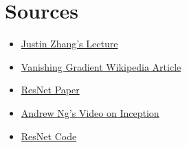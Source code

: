 \documentclass{article}
\begin{document}
\section{Sources}
\begin{itemize}
	\item \href{https://tjmachinelearning.com/lectures/1718/deepconv/deepconv.pdf}{Justin Zhang's Lecture} 
	\item \href{https://en.wikipedia.org/wiki/Vanishing_gradient_problem}{Vanishing Gradient Wikipedia Article}
	\item \href{https://arxiv.org/pdf/1512.03385v1.pdf}{ResNet Paper}
 	\item \href{https://www.coursera.org/lecture/convolutional-neural-networks/inception-network-motivation-5WIZm}{Andrew Ng's Video on Inception}
	\item \href{https://github.com/pytorch/vision/blob/7c077f6a986f05383bcb86b535aedb5a63dd5c4b/torchvision/models/resnet.py#L118}{ResNet Code}
\end{itemize}
\end{document}

